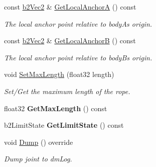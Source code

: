 \begin{DoxyCompactItemize}
const \mbox{\hyperlink{structb2Vec2}{b2\+Vec2}} \& \mbox{\hyperlink{classb2RopeJoint_a5fb600991e676e61e266ecb99448bb86}{Get\+Local\+AnchorA}} () const
\begin{DoxyCompactList}\small\item\em The local anchor point relative to bodyA\textquotesingle{}s origin. \end{DoxyCompactList}\item 
\mbox{\label{classb2RopeJoint_a8a9b925c7ffa11d331ba369cc9fe2ac5}} 
const \mbox{\hyperlink{structb2Vec2}{b2\+Vec2}} \& \mbox{\hyperlink{classb2RopeJoint_a8a9b925c7ffa11d331ba369cc9fe2ac5}{Get\+Local\+AnchorB}} () const
\begin{DoxyCompactList}\small\item\em The local anchor point relative to bodyB\textquotesingle{}s origin. \end{DoxyCompactList}\item 
\mbox{\label{classb2RopeJoint_a92cea201d21acd2f2a7cc9b00e165848}} 
void \mbox{\hyperlink{classb2RopeJoint_a92cea201d21acd2f2a7cc9b00e165848}{Set\+Max\+Length}} (float32 length)
\begin{DoxyCompactList}\small\item\em Set/\+Get the maximum length of the rope. \end{DoxyCompactList}\item 
\mbox{\label{classb2RopeJoint_abdcc1962f25103a49f6e3f4182559efa}} 
float32 {\bfseries Get\+Max\+Length} () const
\item 
\mbox{\label{classb2RopeJoint_ab7b606273b65339f0ab502675f32997e}} 
b2\+Limit\+State {\bfseries Get\+Limit\+State} () const
\item 
\mbox{\label{classb2RopeJoint_a0028d3d3710bf1a9a905e9b55a4f37c5}} 
void \mbox{\hyperlink{classb2RopeJoint_a0028d3d3710bf1a9a905e9b55a4f37c5}{Dump}} () override
\begin{DoxyCompactList}\small\item\em Dump joint to dm\+Log. \end{DoxyCompactList}\end{DoxyCompactItemize}
